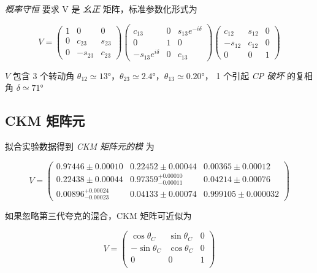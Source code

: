 \documentclass[oneside,a4paper,openany,11pt]{ctexbook}
\begin{document}
\emph{概率守恒} 要求 V 是 \emph{幺正} 矩阵，标准参数化形式为

\begin{equation}
    V = \begin{pmatrix}
        1 & 0 & 0 \\
        0 & c_{23} & s_{23} \\
        0 & -s_{23} & c_{23}
    \end{pmatrix}
    \begin{pmatrix}
        c_{13} & 0 & s_{13} e^{-i\delta} \\
        0 & 1 & 0 \\
        -s_{13} e^{i\delta} & 0 & c_{13}
    \end{pmatrix}
    \begin{pmatrix}
        c_{12} & s_{12} & 0 \\
        -s_{12} & c_{12} & 0 \\
        0 & 0 & 1
    \end{pmatrix}
\end{equation}

$V$ 包含 3 个转动角 $\theta_{12} \simeq \ang{13}$，$\theta_{23} \simeq \ang{2.4}$，$\theta_{13} \simeq \ang{0.20}$， 1 个引起 \emph{CP 破坏} 的复相角 $\delta \simeq \ang{71}$

\subsection{CKM 矩阵元}

拟合实验数据得到 \emph{CKM 矩阵元的模} 为

\begin{equation}
    V =
    \begin{pmatrix}
        0.97446 \pm 0.00010 & 0.22452 \pm 0.00044 & 0.00365 \pm 0.00012 \\
        0.22438 \pm 0.00044 & 0.97359^{+0.00010}_{-0.00011} & 0.04214 \pm 0.00076 \\
        0.00896^{+0.00024}_{-0.00023} & 0.04133 \pm 0.00074 & 0.999105 \pm 0.000032
    \end{pmatrix}
\end{equation}

如果忽略第三代夸克的混合，CKM 矩阵可近似为

\begin{equation}
    V =
    \begin{pmatrix}
        \cos \theta_C & \sin \theta_C & 0 \\
        -\sin \theta_C & \cos \theta_C & 0 \\
        0 & 0 & 1 \\
    \end{pmatrix}
\end{equation}
\end{document}
